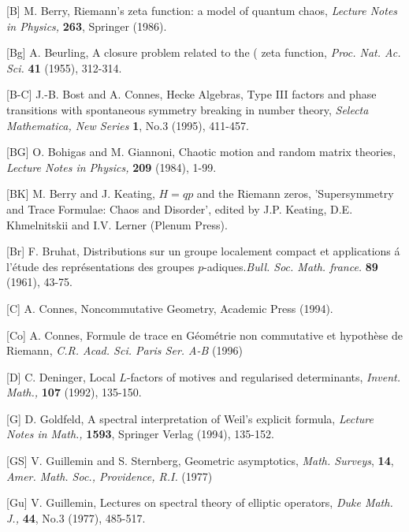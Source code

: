\item{[B]} M. Berry, Riemann's zeta function: a model of
quantum chaos, {\it Lecture Notes in Physics,} {\bf 263},
Springer (1986).
\item{[Bg]} A. Beurling,   A closure problem related to the  ( zeta 
function, {\it Proc. Nat. Ac. Sci.} {\bf 41} (1955),  312-314.
\item{[B-C]} J.-B. Bost and A. Connes, Hecke Algebras, Type
III factors and phase transitions with spontaneous symmetry
breaking in number theory, {\it Selecta Mathematica, New
Series } {\bf 1}, No.3 (1995), 411-457.
\item{[BG]} O. Bohigas and M. Giannoni, Chaotic motion and random matrix 
theories, {\it Lecture Notes in Physics,} {\bf 209} (1984), 1-99.
\item{[BK]} M. Berry and J. Keating, $H=qp$ and the Riemann zeros, 
'Supersymmetry and Trace Formulae: Chaos and Disorder', edited by
J.P. Keating, D.E. Khmelnitskii and I.V. Lerner (Plenum Press).
\item{[Br]} F. Bruhat,  Distributions sur un groupe localement compact 
et applications \'a l'\'etude des repr\'esentations des groupes 
$p$-adiques.{\it Bull. Soc. Math. france.} {\bf 89} (1961),  43-75.
\item{[C]} A. Connes, Noncommutative Geometry, Academic
Press (1994).
\item{[Co]} A. Connes, Formule de trace en G\'eom\'etrie non commutative 
et hypoth\`ese de Riemann, {\it C.R. Acad. Sci. Paris Ser. A-B} (1996)
\item{[D]} C. Deninger, Local $L$-factors of motives and
regularised determinants, {\it Invent. Math.,} {\bf 107}
(1992), 135-150.

\item{[G]} D. Goldfeld, A spectral interpretation of Weil's
explicit formula, {\it Lecture Notes in Math.,} {\bf 1593},
Springer Verlag (1994), 135-152.
\item{[GS]} V. Guillemin and S. Sternberg, Geometric asymptotics, {\it 
Math. Surveys}, {\bf 14}, {\it  Amer. Math. Soc., Providence, R.I.} 
(1977)
\item{[Gu]} V. Guillemin, Lectures on spectral theory of
elliptic operators, {\it Duke Math. J.,} {\bf 44}, No.3
(1977), 485-517.

